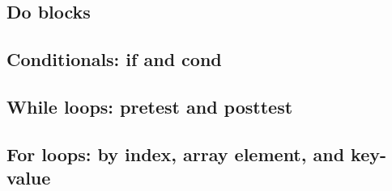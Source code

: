 \documentclass{article}
\theoremstyle{definition}
\begin{document}

\hypertarget{hsec:doblocks}{}
\subsection{Do blocks}
\label{sec:doblocks}


\hypertarget{hsec:conditionals}{}
\subsection{Conditionals: if and cond}
\label{sec:conditionals}


\hypertarget{hsec:whileloops}{}
\subsection{While loops: pretest and posttest}
\label{sec:whileloops}


\hypertarget{hsec:forloops}{}
\subsection{For loops: by index, array element, and key-value}
\label{sec:forloops}

\end{document}
